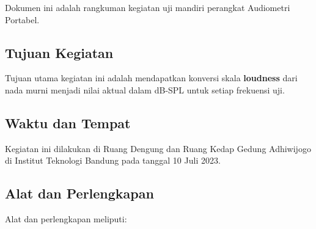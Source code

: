 \documentclass{article}
\begin{document}
	Dokumen ini adalah rangkuman kegiatan uji mandiri perangkat Audiometri Portabel.
	
	\subsection{Tujuan Kegiatan}
	
	Tujuan utama kegiatan ini adalah mendapatkan konversi skala \textbf{loudness} dari nada murni menjadi nilai aktual dalam dB-SPL untuk setiap frekuensi uji.
	
	\subsection{Waktu dan Tempat}
	
	Kegiatan ini dilakukan di Ruang Dengung dan Ruang Kedap Gedung Adhiwijogo di Institut Teknologi Bandung pada tanggal 10 Juli 2023.
	
	\subsection{Alat dan Perlengkapan}
	
	Alat dan perlengkapan meliputi:
	
\end{document}

